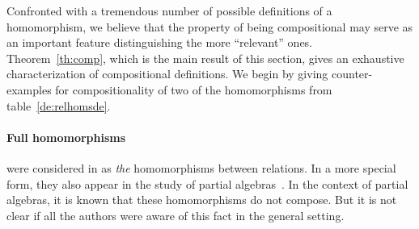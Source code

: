 \documentclass[10pt]{article}
\begin{document}

Confronted with a tremendous number of possible definitions of a
homomorphism, we believe that the property of being compositional may
serve as an important feature distinguishing the more ``relevant''
ones. Theorem~\ref{th:comp}, which is the main result of this section, 
gives an exhaustive characterization of
compositional definitions.  We
begin by giving counter-examples for compositionality of two of the
homomorphisms from table~\ref{de:relhomsde}. 
%
\paragraph{Full homomorphisms}
were considered in \cite{Most,Los:relhoms} as {\em
the} homomorphisms between relations. In a more special form, they also appear 
in the study of partial algebras~\cite{Burmeister}. In the context of partial algebras,
 it is known that these homomorphisms do not compose. But it is not clear if all the
authors were aware of this fact in the general setting. 

\end{document}
